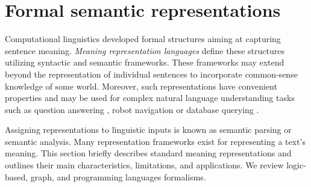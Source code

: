 \section{Formal semantic representations}

Computational linguistics developed formal structures aiming at capturing sentence meaning. \textit{Meaning representation languages} define these structures utilizing syntactic and semantic frameworks. These frameworks may extend beyond the representation of individual sentences to incorporate common-sense knowledge of some world. Moreover, such representations have convenient properties and may be used for complex natural language understanding tasks such as question answering \parencite{pasupat_15}, robot navigation \parencite{artzi2013weakly} or database querying \parencite{zelle1996learning}.

Assigning representations to linguistic inputs is known as semantic parsing or semantic analysis. Many representation frameworks exist for representing a text's meaning. This section briefly describes standard meaning representations and outlines their main characteristics, limitations, and applications. We review logic-based, graph, and programming languages formalisms.




